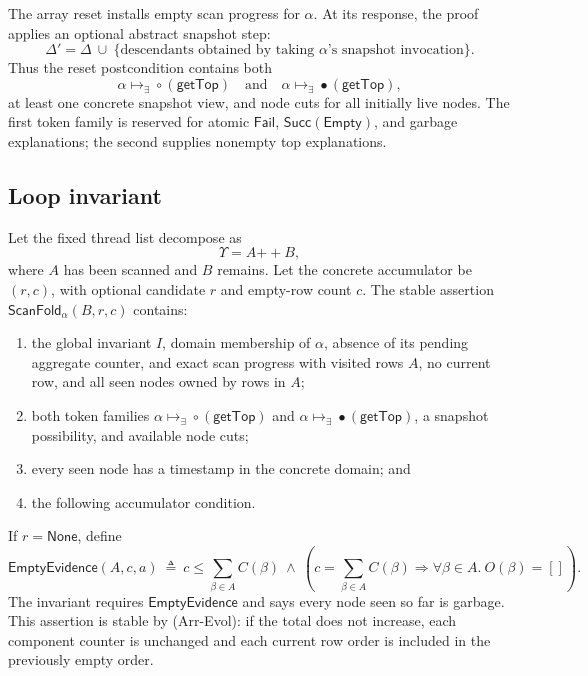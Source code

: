\documentclass[11pt]{article}
\theoremstyle{definition}
\theoremstyle{remark}
\newcommand{\GetTop}{\mathsf{getTop}}
\newcommand{\Succ}{\mathsf{Succ}}
\newcommand{\Fail}{\mathsf{Fail}}
\newcommand{\Empty}{\mathsf{Empty}}
\newcommand{\sometok}[2]{#1\mathrel{\mapsto_{\exists}}#2}
\begin{document}
The array reset installs empty scan progress for \(\alpha\).  At its response,
the proof applies an optional abstract snapshot step:
\[
  \Delta' = \Delta
   \ \cup\ 
   \{\text{descendants obtained by taking }\alpha\text{'s snapshot invocation}\}.
\]
Thus the reset postcondition contains both
\[
  \sometok{\alpha}{\circ(\GetTop)}
  \quad\text{and}\quad
  \sometok{\alpha}{\bullet(\GetTop)},
\]
at least one concrete snapshot view, and node cuts for all initially live
nodes.  The first token family is reserved for atomic \(\Fail\),
\(\Succ(\Empty)\), and garbage explanations; the second supplies nonempty
top explanations.

\subsection{Loop invariant}

Let the fixed thread list decompose as
\[
  \Upsilon=A\mathbin{++}B,
\]
where \(A\) has been scanned and \(B\) remains.  Let the concrete accumulator
be \((r,c)\), with optional candidate \(r\) and empty-row count \(c\).  The
stable assertion \(\mathsf{ScanFold}_\alpha(B,r,c)\) contains:

\begin{enumerate}
\item the global invariant \(I\), domain membership of \(\alpha\), absence of
its pending aggregate counter, and exact scan progress with visited rows
\(A\), no current row, and all seen nodes owned by rows in \(A\);

\item both token families
\(\sometok{\alpha}{\circ(\GetTop)}\) and
\(\sometok{\alpha}{\bullet(\GetTop)}\), a snapshot possibility, and available
node cuts;

\item every seen node has a timestamp in the concrete domain; and

\item the following accumulator condition.
\end{enumerate}

If \(r=\mathsf{None}\), define
\[
\mathsf{EmptyEvidence}(A,c,a)\ \triangleq\
c\le\sum_{\beta\in A}C(\beta)
\ \land\ 
\left(c=\sum_{\beta\in A}C(\beta)
 \Rightarrow \forall\beta\in A.\ O(\beta)=[]\right).
\tag{Empty-Ev}
\]
The invariant requires \(\mathsf{EmptyEvidence}\) and says every node seen so
far is garbage.  This assertion is stable by \textup{(Arr-Evol)}: if the total
does not increase, each component counter is unchanged and each current row
order is included in the previously empty order.
\end{document}
